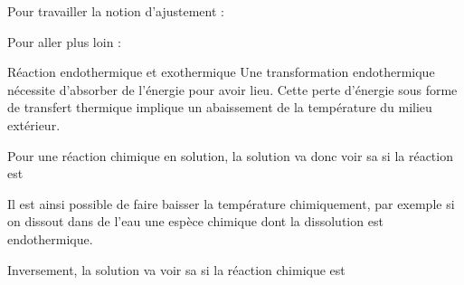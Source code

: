 \begin{minipage}[t]{0.48\linewidth}\vspace{0pt}
  \numeroQuestion
  Pour travailler la notion d'ajustement :

  \begin{center}
  \end{center}
\end{minipage}
\begin{minipage}[t]{0.48\linewidth}\vspace{0pt}
  \numeroQuestion
  Pour aller plus loin :

  \begin{center}
  \end{center}
\end{minipage}


\begin{doc}{Réaction endothermique et exothermique}
  Une transformation endothermique nécessite d'absorber de l'énergie pour avoir lieu.
  Cette perte d'énergie sous forme de transfert thermique implique un abaissement de la température du milieu extérieur.
  
  \begin{importants}
    Pour une réaction chimique en solution, la solution va donc voir sa  si la réaction est 
  \end{importants}
  
  Il est ainsi possible de faire baisser la température chimiquement, par exemple si on dissout dans de l'eau une espèce chimique dont la dissolution est endothermique.
  
  \begin{importants}
    Inversement, la solution va voir sa  si la réaction chimique est 
  \end{importants}
\end{doc}

